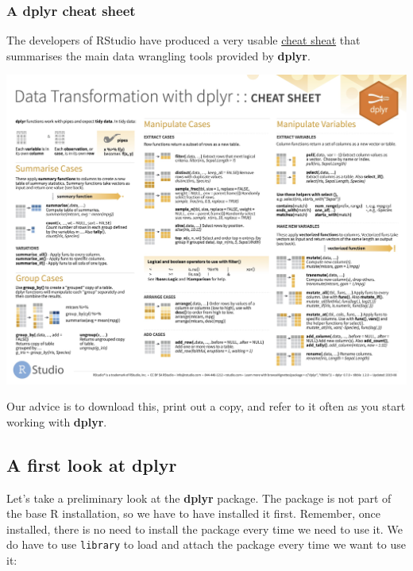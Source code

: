 \documentclass[
]{book}
\newenvironment{greybox}{
  \definecolor{shadecolor}{rgb}{0.95,0.95,0.95}  %
  \color{black}
  \begin{shaded}}
 {\end{shaded}}
\newenvironment{infobox}[1]
  {
  \begin{itemize}
  \renewcommand{\labelitemi}{
    \raisebox{-.7\height}[0pt][0pt]{
      {\setkeys{Gin}{width=3em,keepaspectratio}
        \texttt{[image: images/\#1]}}
    }
  }
  \setlength{\fboxsep}{1em}
  \begin{greybox}
  \item
  }
  {
  \end{greybox}
  \end{itemize}
  }
\begin{document}
\begin{infobox}{information}

\hypertarget{a-dplyr-cheat-sheet}{%
\subsubsection*{\texorpdfstring{A \textbf{dplyr} cheat sheet}{A dplyr cheat sheet}}\label{a-dplyr-cheat-sheet}}

The developers of RStudio have produced a very usable \href{http://www.rstudio.com/resources/cheatsheets/}{cheat sheat} that summarises the main data wrangling tools provided by \textbf{dplyr}.

\begin{center}\includegraphics{images/data-transformation} \end{center}

Our advice is to download this, print out a copy, and refer to it often as you start working with \textbf{dplyr}.

\end{infobox}

\hypertarget{more-dplyr}{%
\subsection{\texorpdfstring{A first look at \textbf{dplyr}}{A first look at dplyr}}\label{more-dplyr}}

Let's take a preliminary look at the \textbf{dplyr} package. The package is not part of the base R installation, so we have to have installed it first. Remember, once installed, there is no need to install the package every time we need to use it. We do have to use \texttt{library} to load and attach the package every time we want to use it:
\end{document}
